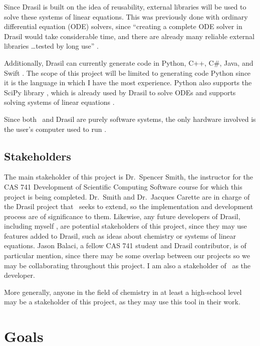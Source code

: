 \documentclass{article}
\begin{document}
Since Drasil is built on the idea of reusability, external libraries will be
used to solve these systems of linear equations. This was previously done with
ordinary differential equation (ODE) solvers, since ``creating a complete ODE
solver in Drasil would take considerable time, and there are already many
reliable external libraries \dots tested by long use''
\cite[p. 24]{chen_solving_2022}.

Additionally, Drasil can currently generate code in Python, C++, C\#, Java, and
Swift \cite{chen_solving_2022}. The scope of this project will be limited to 
generating code Python since it is the language in which I 
have the most experience. Python also supports the SciPy library
\cite{2020SciPy-NMeth}, which is already used by Drasil to solve ODEs
\cite{chen_solving_2022} and supports solving systems of linear equations \cite{the_scipy_community_scipylinalgsolve_2023}.

Since both \progname~and Drasil are purely software systems, the only
hardware involved is the user's computer used to run \progname.

\subsection{Stakeholders}
The main stakeholder of this project is Dr.~Spencer Smith, the instructor for
the CAS 741 Development of Scientific Computing Software course for which this
project is being completed. Dr.~Smith and Dr.~Jacques Carette are in charge of
the Drasil project that \progname~seeks to extend, so the implementation and
development process are of significance to them. Likewise, any future
developers of Drasil, including myself , are
potential stakeholders of this project, since they may use features added to
Drasil, such as ideas about chemistry or systems of linear equations. Jason
Balaci, a fellow CAS 741 student and Drasil contributor, is of particular 
mention, since
there may be some overlap between our projects so we may be collaborating
throughout this project. I am also a stakeholder of \progname~as the
developer.

More generally, anyone in the field of chemistry in at least a high-school level
may be a stakeholder of this project, as they may use this tool in their work.

\section{Goals}
\end{document}
